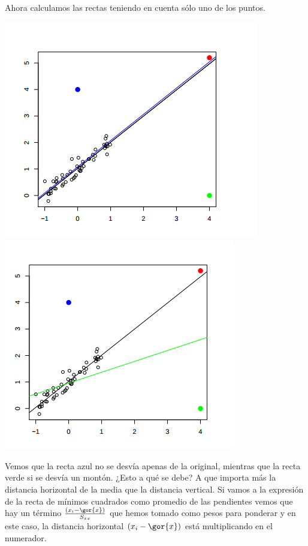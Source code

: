 \begin{itemize}
\begin{example}
Ahora calculamos las rectas teniendo en cuenta sólo uno de los puntos.

\begin{center}
\includegraphics[scale=0.4]{img/sobredistanciahorizontal1.png}
\includegraphics[scale=0.4]{img/sobredistanciahorizontal2.png}
\end{center}

Vemos que la recta azul no se desvía apenas de la original, mientras que la recta verde si se desvía un montón. ¿Esto a qué se debe? A que importa más la distancia horizontal de la media que la distancia vertical. Si vamos a la expresión de la recta de mínimos cuadrados como promedio de las pendientes \label{rmc::promediopendientes} vemos que hay un término $\frac{(x_i - \gor{x})}{S_{xx}}$ que hemos tomado como pesos para ponderar y en este caso, la distancia horizontal $(x_i - \gor{x})$ está multiplicando en el numerador.




\end{example}
\end{itemize}
